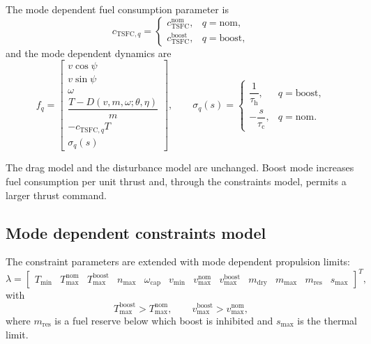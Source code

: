 \documentclass[11pt,a4paper]{article}
\newcommand{\vectheta}{\theta}
\newcommand{\veceta}{\eta}
\newcommand{\veclambda}{\lambda}
\newcommand{\vecf}{f}
\begin{document}
The mode dependent fuel consumption parameter is
\begin{equation}
  c_{\mathrm{TSFC},q} =
  \begin{cases}
    c^{\mathrm{nom}}_{\mathrm{TSFC}}, & q = \mathrm{nom}, \\
    c^{\mathrm{boost}}_{\mathrm{TSFC}}, & q = \mathrm{boost},
  \end{cases}
\end{equation}
and the mode dependent dynamics are
\begin{equation}
  \vecf_q =
  \begin{bmatrix}
    v\cos\psi \\[2pt]
    v\sin\psi \\[2pt]
    \omega \\[2pt]
    \dfrac{T - D(v, m, \omega; \vectheta, \veceta)}{m} \\[8pt]
    -c_{\mathrm{TSFC},q} T \\[4pt]
    \sigma_q(s)
  \end{bmatrix},
  \qquad
  \sigma_q(s) =
  \begin{cases}
    \dfrac{1}{\tau_{\mathrm{h}}}, & q = \mathrm{boost}, \\[8pt]
    -\dfrac{s}{\tau_{\mathrm{c}}}, & q = \mathrm{nom} .
  \end{cases}
  \label{eq:f-mode}
\end{equation}

The drag model and the disturbance model are unchanged. Boost mode increases
fuel consumption per unit thrust and, through the constraints model, permits a
larger thrust command.

\subsection{Mode dependent constraints model}

The constraint parameters are extended with mode dependent propulsion limits:
\begin{equation}
  \veclambda = \begin{bmatrix}
    T_{\min} & T^{\mathrm{nom}}_{\max} & T^{\mathrm{boost}}_{\max} &
    n_{\max} & \omega_{\mathrm{cap}} &
    v_{\min} & v^{\mathrm{nom}}_{\max} & v^{\mathrm{boost}}_{\max} &
    m_{\mathrm{dry}} & m_{\max} & m_{\mathrm{res}} & s_{\max}
  \end{bmatrix}^{T},
\end{equation}
with
\begin{equation}
  T^{\mathrm{boost}}_{\max} > T^{\mathrm{nom}}_{\max},
  \qquad
  v^{\mathrm{boost}}_{\max} > v^{\mathrm{nom}}_{\max},
\end{equation}
where $m_{\mathrm{res}}$ is a fuel reserve below which boost is inhibited and
$s_{\max}$ is the thermal limit.
\end{document}
